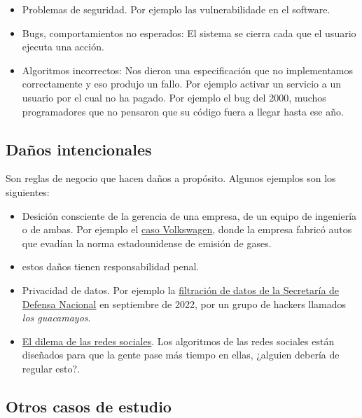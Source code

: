 \documentclass[twoside]{article}
\begin{document}
\begin{multicols}{2}
\begin{itemize}
\item Problemas de seguridad. Por ejemplo las vulnerabilidade en el software.
\item Bugs, comportamientos no esperados: El sistema se cierra cada que el
usuario ejecuta una acción.
\item Algoritmos incorrectos: Nos dieron una especificación que no implementamos
correctamente y eso produjo un fallo. Por ejemplo activar un servicio a un
usuario por el cual no ha pagado. Por ejemplo el bug del 2000, muchos
programadores que no pensaron que su código fuera a llegar hasta ese año.
\end{itemize}

\subsection{Daños intencionales}

Son reglas de negocio que hacen daños a propósito. Algunos ejemplos son los
siguientes:

\begin{itemize}
\item Desición consciente de la gerencia de una empresa, de un equipo de
ingeniería o de ambas. Por ejemplo el
\href{https://repositorio.comillas.edu/rest/bitstreams/295635/retrieve}{caso
Volkswagen}, donde la empresa fabricó autos que evadían la norma estadounidense
de emisión de gases.
\item estos daños tienen responsabilidad penal.
\item Privacidad de datos. Por ejemplo la
\href{https://elpais.com/mexico/2022-10-01/una-masiva-filtracion-expone-el-poder-del-ejercito-mexicano-en-la-vida-publica.html}{filtración
de datos de la Secretaría de Defensa Nacional} en septiembre de 2022, por un
grupo de hackers llamados \textit{los guacamayos}.
\item
\href{https://www.netflix.com/es/title/81254224#:~:text=Este%20documental%20dramatizado%20analiza%20la,las%20herramientas%20creadas%20por%20ellos.&text=Ve%20todo%20lo%20que%20quieras.&text=De%20Jeff%20Orlowski%2C%20director%20del,'%2C%20ganador%20del%20premio%20Emmy.}
{El dilema de las redes sociales}. Los algoritmos de las redes sociales
están diseñados para que la gente pase más tiempo en ellas, ¿alguien debería de
regular esto?.
\end{itemize}

\subsection{Otros casos de estudio}


\end{multicols}
\end{document}
